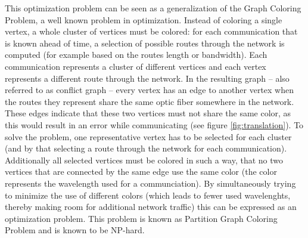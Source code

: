 \documentclass[paper=a4,fontsize=12pt]{scrartcl}
\begin{document}
This optimization problem can be seen as a generalization of the Graph Coloring Problem, a well known problem in optimization. Instead of coloring a single vertex, a whole cluster of vertices must be colored: for each communication that is known ahead of time, a selection of possible routes through the network is computed (for example based on the routes length or bandwidth). Each communication represents a cluster of different vertices and each vertex represents a different route through the network. In the resulting graph -- also referred to as conflict graph -- every vertex has an edge to another vertex when the routes they represent share the same optic fiber somewhere in the network. These edges indicate that these two vertices must not share the same color, as this would result in an error while communicating (see figure \ref{fig:translation}). To solve the problem, one representative vertex has to be selected for each cluster (and by that selecting a route through the network for each communication). Additionally all selected vertices must be colored in such a way, that no two vertices that are connected by the same edge use the same color (the color represents the wavelength used for a communciation). By simultaneously trying to minimize the use of different colors (which leads to fewer used wavelenghts, thereby making room for additional network traffic) this can be expressed as  an optimization problem. This problem is known as Partition Graph Coloring Problem and is known to be NP-hard.

\end{document}
